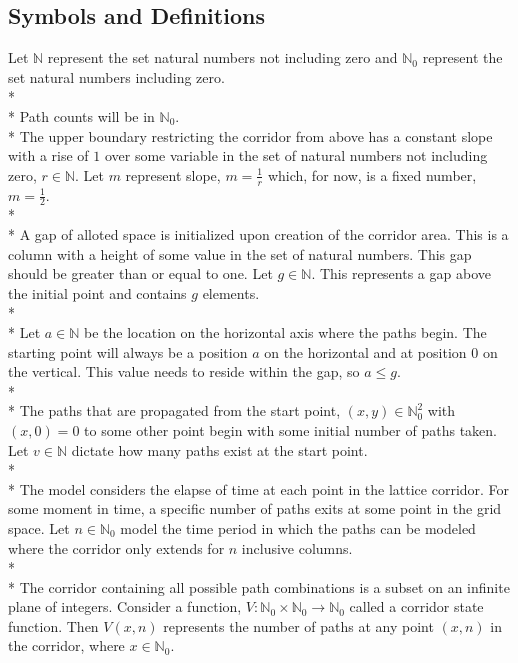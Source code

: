 \documentclass{article}
\newcommand*{\set}[1]{\mathbb{#1}}
\begin{document}
\subsection*{Symbols and Definitions}
Let $\set{N}$ represent the set natural numbers not including zero and $\set{N}_0$ represent the set natural numbers including zero.\\*\\*
Path counts will be in $\set{N}_0$.\\*
The upper boundary restricting the corridor from above has a constant slope with a rise of $1$ over some variable
in the set of natural numbers not including zero, $r \in \set{N}$.
Let $m$ represent slope, $m=\frac{1}{r}$ which, for now, is a fixed number, $m=\frac{1}{2}$.\\*\\*
A gap of alloted space is initialized upon creation of the corridor area. This is a column with a height of some value in 
the set of natural numbers. This gap should be greater than or equal to one.
Let $g \in \set{N}$. This represents a gap above the initial point and contains $g$ elements.\\*\\*
Let $a \in \set{N}$ be the location on the horizontal axis where the paths begin. The starting point will always be a position $a$ on the horizontal and at position $0$ on the vertical. This value needs to reside within the gap, so $a \leq g$.\\*\\*
The paths that are propagated from the start point, $(x,y) \in \set{N}_0^2$ with $(x,0) = 0$ to some other point begin with some initial number of paths taken. 
Let $v \in \set{N}$ dictate how many paths exist at the start point.\\*\\*
The model considers the elapse of time at each point in the lattice corridor. For some moment in time, a specific number of paths exits at some point in the grid space. Let $n \in \set{N}_0$ model the time period in which the paths can be modeled where the corridor
 only extends for $n$ inclusive columns.\\*\\*
The corridor containing all possible path combinations is a subset on an infinite plane of integers. 
Consider a  function, $V \mathpunct{:} \set{N}_0 \times \set{N}_0 \rightarrow \set{N}_0$ called a corridor state function. Then $V(x, n)$ represents the number of paths at any point $(x, n)$ in the corridor, where $x \in \set{N}_0$.
\end{document}
